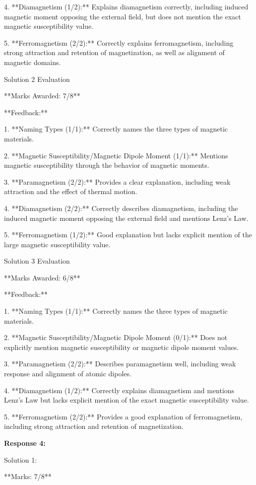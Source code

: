 \documentclass[a4paper,11pt]{article}
\begin{document}
4. **Diamagnetism (1/2):** Explains diamagnetism correctly, including induced magnetic moment opposing the external field, but does not mention the exact magnetic susceptibility value.

5. **Ferromagnetism (2/2):** Correctly explains ferromagnetism, including strong attraction and retention of magnetization, as well as alignment of magnetic domains.

Solution 2 Evaluation

**Marks Awarded: 7/8**

**Feedback:**

1. **Naming Types (1/1):** Correctly names the three types of magnetic materials.

2. **Magnetic Susceptibility/Magnetic Dipole Moment (1/1):** Mentions magnetic susceptibility through the behavior of magnetic moments.

3. **Paramagnetism (2/2):** Provides a clear explanation, including weak attraction and the effect of thermal motion.

4. **Diamagnetism (2/2):** Correctly describes diamagnetism, including the induced magnetic moment opposing the external field and mentions Lenz's Law.

5. **Ferromagnetism (1/2):** Good explanation but lacks explicit mention of the large magnetic susceptibility value.

Solution 3 Evaluation

**Marks Awarded: 6/8**

**Feedback:**

1. **Naming Types (1/1):** Correctly names the three types of magnetic materials.

2. **Magnetic Susceptibility/Magnetic Dipole Moment (0/1):** Does not explicitly mention magnetic susceptibility or magnetic dipole moment values.

3. **Paramagnetism (2/2):** Describes paramagnetism well, including weak response and alignment of atomic dipoles.

4. **Diamagnetism (1/2):** Correctly explains diamagnetism and mentions Lenz's Law but lacks explicit mention of the exact magnetic susceptibility value.

5. **Ferromagnetism (2/2):** Provides a good explanation of ferromagnetism, including strong attraction and retention of magnetization.

\bigskip    
\textbf{Response 4:}

Solution 1:

**Marks: 7/8**
\end{document}

